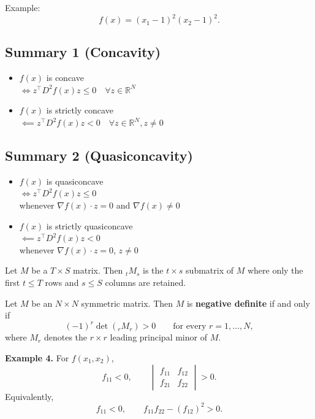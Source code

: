 Example:
\[
f(x) = (x_1 - 1)^2 (x_2 - 1)^2.
\]

\vspace{1em}

\subsection*{Summary 1 (Concavity)}

\begin{itemize}
    
    \item $f(x)$ is concave \\
    $\iff z^\top D^2 f(x) z \le 0 \quad \forall z \in \mathbb{R}^N$
    \item $f(x)$ is strictly concave \\
    $\impliedby z^\top D^2 f(x) z < 0 \quad \forall z \in \mathbb{R}^N, z \ne 0$ 
\end{itemize}

\subsection*{Summary 2 (Quasiconcavity)}

\begin{itemize}
    \item $f(x)$ is quasiconcave \\
    $\iff z^\top D^2 f(x) z \le 0$\\
    whenever $\nabla f(x)\cdot z = 0$ and $\nabla f(x) \ne 0$
    \item $f(x)$ is strictly quasiconcave \\
    $\impliedby z^\top D^2 f(x) z < 0$\\
    whenever $\nabla f(x)\cdot z = 0$, $z \ne 0$
\end{itemize}



Let $M$ be a $T \times S$ matrix. 
Then ${}_t M_{s}$ is the $t \times s$ submatrix of $M$ where only the first $t \le T$ rows and $s \le S$ columns are retained.

Let $M$ be an $N \times N$ symmetric matrix. Then $M$ is \textbf{negative definite}
if and only if
\[
(-1)^r \det({}_r M_r) > 0
\qquad \text{for every } r=1,\dots,N,
\]
where $M_r$ denotes the $r \times r$ leading principal minor of $M$.

\vspace{1em}

\textbf{Example 4.} For $f(x_1,x_2)$,
\[
f_{11} < 0, \qquad
\begin{vmatrix}
f_{11} & f_{12} \\
f_{21} & f_{22}
\end{vmatrix} > 0.
\]
Equivalently,
\[
f_{11} < 0, \qquad f_{11}f_{22} - (f_{12})^2 > 0.
\]

